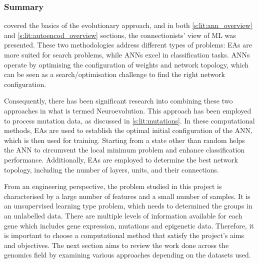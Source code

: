 \subsubsection{Summary} \label{s:lit:choosing_ml}

 covered the basics of the evolutionary approach, and in both \ref{s:lit:ann_overview} and \ref{s:lit:autoencod_overview} sections, the connectionists' view of ML was presented. These two methodologies address different types of problems: EAs are more suited for search problems, while ANNs excel in classification tasks. ANNs operate by optimising the configuration of weights and network topology, which can be seen as a search/optimisation challenge to find the right network configuration. 

Consequently, there has been significant research into combining these two approaches in what is termed Neuroevolution. This approach has been employed to process mutation data, as discussed in \cref{s:lit:mutations}. In these computational methods, EAs are used to establish the optimal initial configuration of the ANN, which is then used for training. Starting from a state other than random helps the ANN to circumvent the local minimum problem and enhance classification performance. Additionally, EAs are employed to determine the best network topology, including the number of layers, units, and their connections.

From an engineering perspective, the problem studied in this project is characterised by a large number of features and a small number of samples. It is an unsupervised learning type problem, which needs to determined the groups in an unlabelled data. There are multiple levels of information available for each gene which includes gene expression, mutations and epigenetic data. Therefore, it is important to choose a computational method that satisfy the project's aims and objectives. The next section aims to review the work done across the genomics field by examining various approaches depending on the datasets used.
